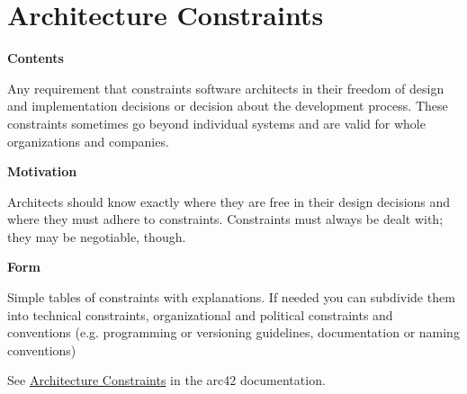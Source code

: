\hypertarget{section-architecture-constraints}{%
\section{Architecture
Constraints}\label{section-architecture-constraints}}

\textbf{Contents}

Any requirement that constraints software architects in their freedom of
design and implementation decisions or decision about the development
process. These constraints sometimes go beyond individual systems and
are valid for whole organizations and companies.

\textbf{Motivation}

Architects should know exactly where they are free in their design
decisions and where they must adhere to constraints. Constraints must
always be dealt with; they may be negotiable, though.

\textbf{Form}

Simple tables of constraints with explanations. If needed you can
subdivide them into technical constraints, organizational and political
constraints and conventions (e.g. programming or versioning guidelines,
documentation or naming conventions)

See \href{https://docs.arc42.org/section-2/}{Architecture Constraints}
in the arc42 documentation.
